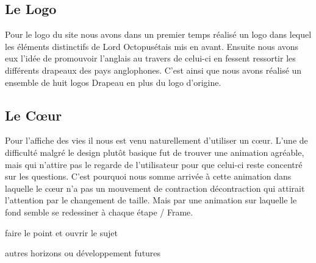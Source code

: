 \documentclass[a4paper,11pt, oneside]{book}
\def\octopusName{Lord Octopus}
\begin{document}
\subsection*{Le Logo}
Pour le logo du site nous avons dans un premier temps réalisé un logo dans lequel les éléments distinctifs de \octopusName étais mis en avant.
Ensuite nous avons eux l’idée de promouvoir l’anglais au travers de celui-ci en fessent ressortir les différents drapeaux des pays anglophones.
C’est ainsi que nous avons réalisé un ensemble de huit logos Drapeau en plus du logo d’origine.

\subsection*{Le Cœur}
Pour l’affiche des vies il nous est venu naturellement d’utiliser un cœur.
L’une de difficulté malgré le design plutôt basique fut de trouver une animation agréable, mais qui n’attire pas le regarde de l’utilisateur pour que celui-ci reste concentré sur les questions.
C’est pourquoi nous somme arrivée à cette animation dans laquelle le cœur n’a pas un mouvement de contraction décontraction qui attirait l’attention par le changement de taille. Mais par une
animation sur laquelle le fond semble se redessiner à chaque étape / Frame.



faire le point et ouvrir le sujet

autres horizons ou développement futures
\end{document}
